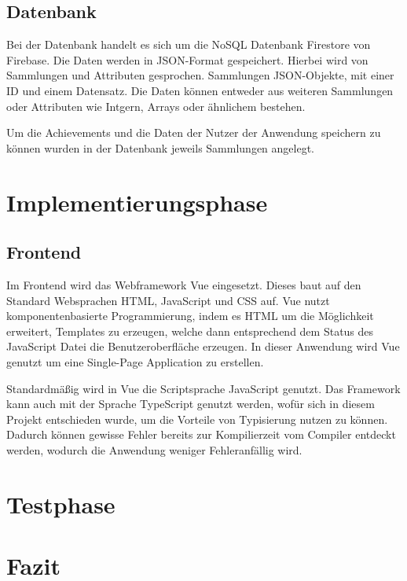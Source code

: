 \documentclass[12pt]{article}
\begin{document}
\subsection{Datenbank}

Bei der Datenbank handelt es sich um die NoSQL Datenbank Firestore
von Firebase. Die Daten werden in JSON-Format gespeichert. Hierbei wird
von Sammlungen und Attributen gesprochen. Sammlungen JSON-Objekte, mit einer
ID und einem Datensatz. Die Daten können entweder aus weiteren Sammlungen
oder Attributen wie Intgern, Arrays oder ähnlichem bestehen.

Um die Achievements und die Daten der Nutzer der Anwendung speichern zu können
wurden in der Datenbank jeweils Sammlungen angelegt.


%
%

\section{Implementierungsphase}

\subsection{Frontend}

Im Frontend wird das Webframework Vue eingesetzt. Dieses baut auf den
Standard Websprachen HTML, JavaScript und CSS auf. Vue nutzt
komponentenbasierte Programmierung, indem es HTML um die Möglichkeit
erweitert, Templates zu erzeugen, welche dann entsprechend dem Status des
JavaScript Datei die Benutzeroberfläche erzeugen.
In dieser Anwendung wird Vue genutzt um eine Single-Page Application zu
erstellen.

Standardmäßig wird in Vue die Scriptsprache JavaScript genutzt. Das Framework
kann auch mit der Sprache TypeScript genutzt werden, wofür sich in diesem
Projekt entschieden wurde, um die Vorteile von Typisierung nutzen zu können.
Dadurch können gewisse Fehler bereits zur Kompilierzeit vom Compiler entdeckt werden,
wodurch die Anwendung weniger Fehleranfällig wird.





%
%

\section{Testphase}



%
%

\section{Fazit}
\end{document}
